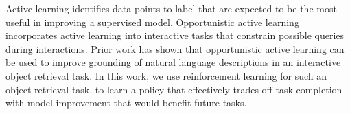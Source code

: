 Active learning identifies data points to label that are expected to be the most useful in improving a supervised model. Opportunistic active learning incorporates active learning into interactive tasks that constrain possible queries during interactions. Prior work has shown that opportunistic active learning can be used to improve grounding of natural language descriptions in an interactive object retrieval task. In this work, we use reinforcement learning for such an object retrieval task, to learn a policy that effectively trades off task completion with model improvement that would benefit future tasks.

